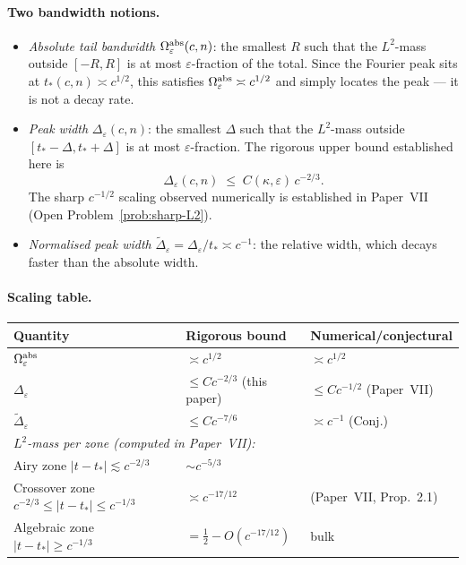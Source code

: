 \documentclass[12pt,a4paper]{amsart}
\theoremstyle{definition}
\theoremstyle{remark}
\begin{document}
\paragraph{Two bandwidth notions.}
\begin{itemize}
\item \emph{Absolute tail bandwidth}
$\Omega_\varepsilon^{\rm abs}(c,n)$:
the smallest $R$ such that the $L^2$-mass outside $[-R,R]$
is at most $\varepsilon$-fraction of the total.
Since the Fourier peak sits at $t_*(c,n)\asymp c^{1/2}$,
this satisfies $\Omega_\varepsilon^{\rm abs}\asymp c^{1/2}$
and simply locates the peak --- it is not a decay rate.

\item \emph{Peak width} $\Delta_\varepsilon(c,n)$:
the smallest $\Delta$ such that the $L^2$-mass outside
$[t_*-\Delta, t_*+\Delta]$ is at most $\varepsilon$-fraction.
The rigorous upper bound established here is
\[
\Delta_\varepsilon(c,n) \;\le\; C(\kappa,\varepsilon)\,c^{-2/3}.
\]
The sharp $c^{-1/2}$ scaling observed numerically is
established in Paper~VII~\cite{PaperVII}
(Open Problem~\ref{prob:sharp-L2}).

\item \emph{Normalised peak width}
$\widetilde\Delta_\varepsilon = \Delta_\varepsilon/t_*\asymp c^{-1}$:
the relative width, which decays faster than the absolute width.
\end{itemize}

\paragraph{Scaling table.}
\begin{center}
\begin{tabular}{lll}
\toprule
Quantity & Rigorous bound & Numerical/conjectural \\
\midrule
$\Omega_\varepsilon^{\rm abs}$ & $\asymp c^{1/2}$ & $\asymp c^{1/2}$ \\
$\Delta_\varepsilon$ & $\le C c^{-2/3}$ (this paper) & $\le C c^{-1/2}$ (Paper~VII) \\
$\widetilde\Delta_\varepsilon$ & $\le C c^{-7/6}$ & $\asymp c^{-1}$ (Conj.) \\
\midrule
\multicolumn{3}{l}{\emph{$L^2$-mass per zone (computed in Paper~VII):}} \\
Airy zone $|t-t_*|\lesssim c^{-2/3}$ & $\sim c^{-5/3}$ & \\
Crossover zone $c^{-2/3}\le|t-t_*|\le c^{-1/3}$ & $\asymp c^{-17/12}$ & (Paper~VII, Prop.~2.1) \\
Algebraic zone $|t-t_*|\ge c^{-1/3}$ & $= \tfrac{1}{2} - O(c^{-17/12})$ & bulk \\
\bottomrule
\end{tabular}
\end{center}
\end{document}
